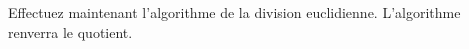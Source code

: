 \documentclass[11pt,a4paper]{article}
\begin{document}
%

\bigskip


\vfillLast

\newpage

\vfillFirst


Effectuez maintenant l'algorithme de la division euclidienne.
L'algorithme renverra le quotient.


\bigskip
\end{document}
